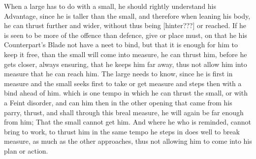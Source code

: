 When a large has to do with a small, he should rightly understand his
Advantage, since he is taller than the small, and therefore when
leaning his body, he can thrust further and wider, without thus being
[hinter???] or reached.
If he is seen to be more of the offence than defence, give or place
must, on that he his Counterpart's Blade not have a neet to bind, but
that it is enough for him to keep it free, 
than the small will come into measure, he can thrust him, before he
gets closer, always ensuring, that he keeps him far away, thus not
allow him into measure that he can reach him. The large needs to know,
since he is first in measure and the small seeks first to take or get
measure and steps then with a bind ahead of him.
which is one tempo in which he can thrust the small, or with a Feint
disorder, and can him then in the other opening that came from his parry,
thrust, and shall through this breal measure, he will again be far
enough from him;
That the small cannot get him. And where he who is reminded, cannot
bring to work, to thrust him in the same tempo he steps in does well
to break measure, as much as the other approaches, thus not allowing
him to come into his plan or action.

